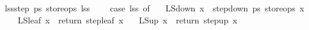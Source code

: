 \begin{isabellebody}
{\isachardoublequoteopen}lss{\isacharunderscore}step\ ps{}\ store{\isacharunderscore}ops\ lss\ {\isacharequal}\ {\isacharparenleft}\isanewline
\ \ case\ lss\ of\ \isanewline
\ \ LS{\isacharunderscore}down\ x\ {\isasymRightarrow}\ {\isacharparenleft}step{\isacharunderscore}down\ ps{}\ store{\isacharunderscore}ops\ x{\isacharparenright}\isanewline
\ \ {\isacharbar}\ LS{\isacharunderscore}leaf\ x\ {\isasymRightarrow}\ {\isacharparenleft}return\ {\isacharparenleft}step{\isacharunderscore}leaf\ x{\isacharparenright}{\isacharparenright}\isanewline
\ \ {\isacharbar}\ LS{\isacharunderscore}up\ x\ {\isasymRightarrow}\ {\isacharparenleft}return\ {\isacharparenleft}step{\isacharunderscore}up\ x{\isacharparenright}{\isacharparenright}\ \isanewline
{\isacharparenright}{\isachardoublequoteclose}\isanewline
%
\isadelimtheory
\isanewline
%
\endisadelimtheory
%
\isatagtheory
{}\isamarkupfalse%
%
\endisatagtheory
{\isafoldtheory}%
%
\isadelimtheory
%
\endisadelimtheory
\end{isabellebody}%
